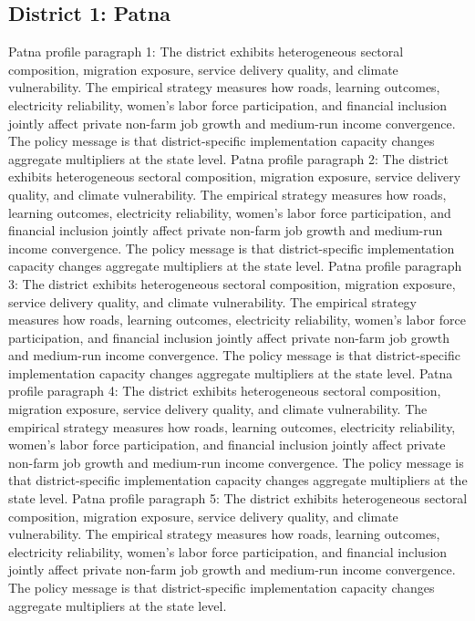\documentclass[preprint,12pt]{elsarticle}
\begin{document}
\subsection{District 1: Patna}
Patna profile paragraph 1: The district exhibits heterogeneous sectoral composition, migration exposure, service delivery quality, and climate vulnerability. The empirical strategy measures how roads, learning outcomes, electricity reliability, women's labor force participation, and financial inclusion jointly affect private non-farm job growth and medium-run income convergence. The policy message is that district-specific implementation capacity changes aggregate multipliers at the state level.
Patna profile paragraph 2: The district exhibits heterogeneous sectoral composition, migration exposure, service delivery quality, and climate vulnerability. The empirical strategy measures how roads, learning outcomes, electricity reliability, women's labor force participation, and financial inclusion jointly affect private non-farm job growth and medium-run income convergence. The policy message is that district-specific implementation capacity changes aggregate multipliers at the state level.
Patna profile paragraph 3: The district exhibits heterogeneous sectoral composition, migration exposure, service delivery quality, and climate vulnerability. The empirical strategy measures how roads, learning outcomes, electricity reliability, women's labor force participation, and financial inclusion jointly affect private non-farm job growth and medium-run income convergence. The policy message is that district-specific implementation capacity changes aggregate multipliers at the state level.
Patna profile paragraph 4: The district exhibits heterogeneous sectoral composition, migration exposure, service delivery quality, and climate vulnerability. The empirical strategy measures how roads, learning outcomes, electricity reliability, women's labor force participation, and financial inclusion jointly affect private non-farm job growth and medium-run income convergence. The policy message is that district-specific implementation capacity changes aggregate multipliers at the state level.
Patna profile paragraph 5: The district exhibits heterogeneous sectoral composition, migration exposure, service delivery quality, and climate vulnerability. The empirical strategy measures how roads, learning outcomes, electricity reliability, women's labor force participation, and financial inclusion jointly affect private non-farm job growth and medium-run income convergence. The policy message is that district-specific implementation capacity changes aggregate multipliers at the state level.
\end{document}
